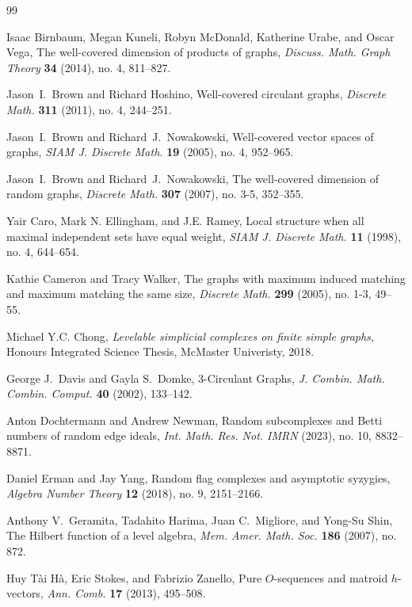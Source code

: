 \documentclass[12pt]{amsart}
\numberwithin{equation}{section}
\theoremstyle{definition}
\newcounter{i} %
\begin{document}
%
\begin{thebibliography}{99}

Isaac Birnbaum, Megan Kuneli, Robyn McDonald, 
Katherine Urabe, and Oscar Vega,
The well-covered dimension of products of graphs,
{\it Discuss. Math. Graph Theory} {\bf 34} (2014), no. 4, 811--827.

Jason~I.~Brown and Richard Hoshino,
Well-covered circulant graphs,
{\it Discrete Math.} {\bf 311} (2011), no. 4, 244--251.

Jason~I.~Brown and Richard~J.~Nowakowski,
Well-covered vector spaces of graphs,
{\it SIAM J. Discrete Math.} {\bf 19} (2005), no. 4, 952--965.

Jason~I.~Brown and Richard~J.~Nowakowski,
The well-covered dimension of random graphs,
{\it Discrete Math.} {\bf 307} (2007), no. 3-5, 352--355.

 Yair Caro, Mark N. Ellingham, and J.E. Ramey, 
Local structure when all maximal independent sets have equal weight,
{\it SIAM J. Discrete Math.} {\bf 11} (1998), no. 4, 644--654.

Kathie Cameron and Tracy Walker,
The graphs with maximum induced matching and maximum matching the same size,
{\it Discrete Math.} {\bf  299} (2005), no. 1-3, 49--55.

Michael Y.C. Chong,
{\it Levelable simplicial complexes on finite simple graphs,}
Honours Integrated Science Thesis, McMaster Univeristy, 2018.

George J.~Davis and Gayla S.~Domke, 
3-Circulant Graphs, 
\textit{J. Combin. Math. Combin. Comput.} {\bf 40} (2002), 133--142.

Anton Dochtermann and Andrew Newman,
Random subcomplexes and Betti numbers of random edge ideals,
{\it Int. Math. Res. Not. IMRN} (2023), no. 10, 8832--8871.

Daniel Erman and Jay Yang,
Random flag complexes and asymptotic syzygies,
{\it Algebra Number Theory} {\bf 12} (2018), no. 9, 2151--2166.

Anthony V.~Geramita, Tadahito Harima, Juan C.~Migliore, and Yong-Su Shin,
The Hilbert function of a level algebra,
{\it Mem. Amer. Math. Soc.} {\bf 186} (2007), no. 872.

 Huy T\`ai H\`a, Eric Stokes, and Fabrizio Zanello, 
Pure $O$-sequences and matroid $h$-vectors, 
{\it Ann. Comb.} \textbf{17} (2013), 495--508.


\end{thebibliography}
\end{document}
